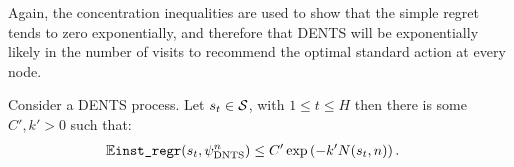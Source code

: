 
        Again, the concentration inequalities are used to show that the simple regret tends to zero exponentially, and therefore that DENTS will be exponentially likely in the number of visits to recommend the optimal standard action at every node.
            
        \begin{lemma} \label{lem:dents_imm_simple_regret}
            Consider a DENTS process. Let $s_t\in\mathcal{S}$, with $1\leq t \leq H$  then there is some $C',k'>0$ such that:
            \begin{align}
                \mathbb{E} {\textnormal{\texttt{inst\_regr}}}(s_{t},{\psi^{n}_{{\textnormal{DNTS}}}}) &\leq C'\exp\left( -k' N(s_{t},n) \right).
            \end{align}
        \end{lemma}
